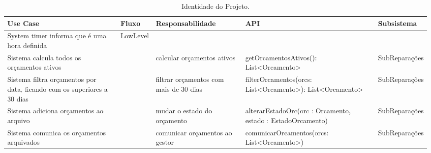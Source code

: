 \documentclass[../relatorio.tex]{subfiles}
\begin{document}
\begin{landscape}
    \begin{table}[!h]
        \centering
        \begin{tabular}{|p{5cm}|p{1cm}|p{4cm}|p{6cm}|p{3cm}|}
            \hline
            \rowcolor{gray!20!white}
            Use Case                                                                & Fluxo    & Responsabilidade                       & API                                                      & Subsistema    \\
            \hline
            \rowcolor{red}
            System timer informa que é uma hora definida                            & LowLevel &                                        &                                                          &               \\
            \hline
            Sistema calcula todos os orçamentos ativos                              &          & calcular orçamentos ativos             & getOrcamentosAtivos(): List<Orcamento>                   & SubReparações \\
            \hline
            Sistema filtra orçamentos por data, ficando com os superiores a 30 dias &          & filtrar orçamentos com mais de 30 dias & filterOrcamentos(orcs: List<Orcamento>): List<Orcamento> & SubReparações \\
            \hline
            Sistema adiciona orçamentos ao arquivo                                  &          & mudar o estado do orçamento    & alterarEstadoOrc(orc : Orcamento, estado : EstadoOrcamento)                        & SubReparações \\
            \hline
            Sistema comunica os orçamentos arquivados                               &          & comunicar orçamentos ao gestor         & comunicarOrcamentos(orcs: List<Orcamento>)               & SubReparações \\
            \hline                      
        \end{tabular}
        \caption{Identidade do Projeto.}
    \end{table}
\end{landscape}
\end{document}
